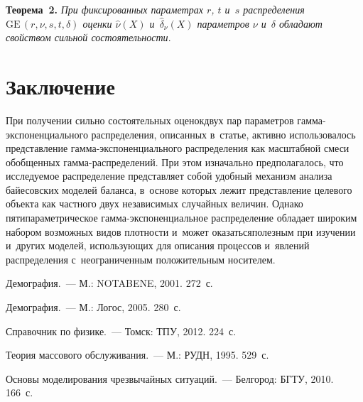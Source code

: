\begin{multicols}{2}
\noindent
\textbf{Теорема~2.} \textit{При фиксированных параметрах $r$, $t$ и~$s$ 
распределения 
$\mathrm{GE}\,(r,\nu,s,t,\delta)$ оценки ${\hat \nu}(X)$ 
и~${\hat \delta}_\nu(X)$ 
параметров $\nu$ и~$\delta$ обладают свойством сильной состоятельности}.


\section{Заключение}

При получении сильно состоятельных оценок\linebreak двух пар параметров
 гам\-ма-экс\-по\-нен\-ци\-аль\-но\-го распределения, описанных в~статье, активно использовалось 
представление гам\-ма-экс\-по\-нен\-ци\-аль\-но\-го распределения 
как масштабной смеси 
обобщенных гам\-ма-рас\-пре\-де\-ле\-ний. При этом изначально предполагалось, что 
исследуемое рас\-пределение пред\-став\-ля\-ет собой удобный механизм анализа 
байесовских моделей баланса, в~основе которых лежит представление целевого 
объекта как частного двух независимых случайных величин. Однако 
пятипараметрическое гам\-ма-экс\-по\-нен\-ци\-аль\-ное распределение обладает широким 
набором возможных видов плот\-ности и~может оказаться\linebreak полезным при изучении 
и~других моделей, ис\-поль\-зу\-ющих для описания процессов и~явлений распределения 
с~неограниченным положительным носителем.


{\small\frenchspacing
 {%
 \begin{thebibliography}{99}
Демография.~--- М.: NOTABENE, 2001. 272~с.

Демография.~--- М.: Логос, 2005. 280~с.



Справочник по физике.~--- Томск: ТПУ, 2012. 224~с.

Теория массового обслуживания.~--- М.: РУДН, 1995. 529~с.

Основы моделирования чрезвычайных ситуаций.~--- 
Белгород: БГТУ, 2010. 166~с.



\end{thebibliography}}}
\end{multicols}
